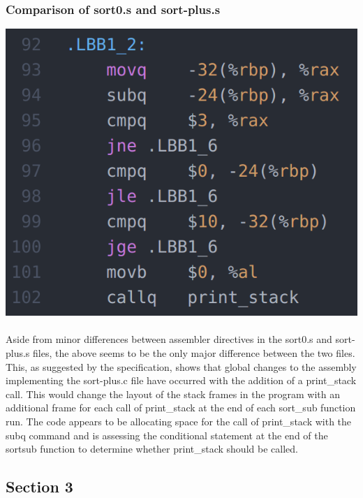 \documentclass[11]{article}
\begin{document}
			\subsubsection{Comparison of sort0.s and sort-plus.s}
			\includegraphics[scale=0.5]{sort-plus.png} \\\\ Aside from minor differences between assembler directives in the sort0.s and sort-plus.s files, the above seems to be the only major difference between the two files. This, as suggested by the specification, shows that global changes to the assembly implementing the sort-plus.c file have occurred with the addition of a print\_stack call. This would change the layout of the stack frames in the program with an additional frame for each call of print\_stack at the end of each sort\_sub function run. The code appears to be allocating space for the call of print\_stack with the subq command and is assessing the conditional statement at the end of the sortsub function to determine whether print\_stack should be called.
		\subsection{Section 3}
\end{document}
